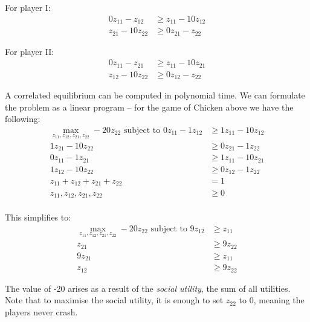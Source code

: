 		For player I:
		\begin{equation*}
			\begin{split}
				0 z_{11} - z_{12} & \ge z_{11} -10 z_{12} \\
				z_{21} - 10 z_{22} & \ge 0 z_{21} - z_{22}
			\end{split}
		\end{equation*}

		For player II:
		\begin{equation*}
			\begin{split}
				0 z_{11} - z_{21} & \ge z_{11} -10 z_{21} \\
				z_{12} - 10 z_{22} & \ge 0 z_{12} - z_{22}
			\end{split}
		\end{equation*}

		A correlated equilibrium can be computed in polynomial time. We can
		formulate the problem as a linear program -- for the game of Chicken
		above we have the following:
		\begin{equation*}
			\begin{split}
				\max_{z_{11}, z_{12}, z_{21}, z_{22}} -20 z_{22} \text{ subject
				to } 0 z_{11} - 1 z_{12} & \ge 1 z_{11} - 10 z_{12} \\
				1 z_{21} - 10 z_{22} & \ge 0 z_{21} - 1 z_{22} \\
				0 z_{11} - 1 z_{21} & \ge 1 z_{11} - 10 z_{21} \\
				1 z_{12} - 10 z_{22} & \ge 0 z_{12} - 1 z_{22} \\
				z_{11} + z_{12} + z_{21} + z_{22} & = 1 \\
				z_{11}, z_{12}, z_{21}, z_{22} & \ge 0 \\
			\end{split}
		\end{equation*}

		This simplifies to:
		\begin{equation*}
			\begin{split}
				\max_{z_{11}, z_{12}, z_{21}, z_{22}} -20 z_{22} \text{ subject
				to } 9 z_{12} & \ge z_{11} \\
				z_{21} & \ge 9 z_{22} \\
				9 z_{21} & \ge z_{11} \\
				z_{12} & \ge 9 z_{22}
			\end{split}
		\end{equation*}

		The value of -20 arises as a result of the \emph{social utility}, the
		sum of all utilities. Note that to maximise the social utility, it is
		enough to set $z_{22}$ to 0, meaning the players never crash.
